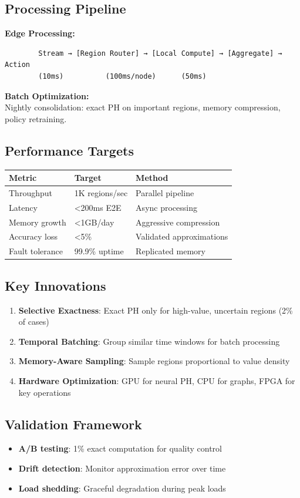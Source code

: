 \documentclass[11pt,english]{article}
\theoremstyle{remark}
\begin{document}
	\subsection*{Processing Pipeline}
	\noindent
	\textbf{Edge Processing:}
	\begin{verbatim}
		Stream → [Region Router] → [Local Compute] → [Aggregate] → Action
		(10ms)          (100ms/node)      (50ms)
	\end{verbatim}
	
	\noindent
	\textbf{Batch Optimization:} \\
	Nightly consolidation: exact PH on important regions, memory compression, policy retraining.
	
	\subsection*{Performance Targets}
	\begin{tabular}{@{}lll@{}}
		\toprule
		Metric & Target & Method \\
		\midrule
		Throughput & 1K regions/sec & Parallel pipeline \\
		Latency & <200ms E2E & Async processing \\
		Memory growth & <1GB/day & Aggressive compression \\
		Accuracy loss & <5\% & Validated approximations \\
		Fault tolerance & 99.9\% uptime & Replicated memory \\
		\bottomrule
	\end{tabular}
	
	\subsection*{Key Innovations}
	\begin{enumerate}
		\item \textbf{Selective Exactness}: Exact PH only for high-value, uncertain regions (2\% of cases)
		\item \textbf{Temporal Batching}: Group similar time windows for batch processing
		\item \textbf{Memory-Aware Sampling}: Sample regions proportional to value density
		\item \textbf{Hardware Optimization}: GPU for neural PH, CPU for graphs, FPGA for key operations
	\end{enumerate}
	
	\subsection*{Validation Framework}
	\begin{itemize}
		\item \textbf{A/B testing}: 1\% exact computation for quality control
		\item \textbf{Drift detection}: Monitor approximation error over time
		\item \textbf{Load shedding}: Graceful degradation during peak loads
	\end{itemize}
	
\end{document}
